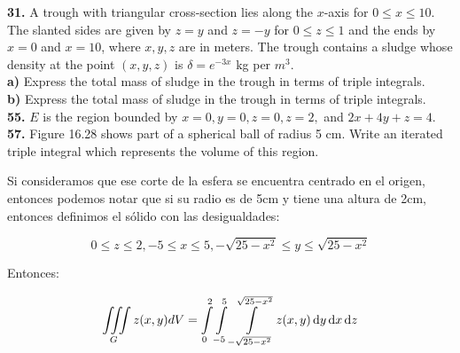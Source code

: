 \documentclass[11pt]{report}
\begin{document}
\textbf{31.} A trough with triangular cross-section lies along the $x$-axis for
$0 \leq x \leq 10$. The slanted sides are given by $z = y$ and $z = -y$ for
$0 \leq z \leq 1$ and the ends by $x = 0$ and $x = 10$, where $x, y, z$ are in meters.
The trough contains a sludge whose density at the point $(x, y, z)$ is
$\delta = e^{-3x}$ kg per $m^3$. \\

\textbf{a)} Express the total mass of sludge in the trough in terms of triple
integrals. \\

\textbf{b)} Express the total mass of sludge in the trough in terms of triple
integrals. \\

\textbf{55.} $E$ is the region bounded by $x = 0, y = 0, z = 0, z = 2,$
and $2x + 4y + z = 4$. \\

\textbf{57.} Figure 16.28 shows part of a spherical ball of radius 5 cm.
Write an iterated triple integral which represents the volume of this region. \\

\begin{figure}[h]
\centering
\end{figure}

Si consideramos que ese corte de la esfera se encuentra centrado en el origen,
entonces podemos notar que si su radio es de 5cm y tiene una altura de 2cm,
entonces definimos el sólido con las desigualdades:

\[ 0 \leq z \leq 2, -5 \leq x \leq 5, - \sqrt{25 - x^2} \leq y \leq \sqrt{25 - x^2}\]

Entonces:

\[ \iiint \limits_G z(x,y) dV = \int \limits_0^2 \int \limits_{-5}^5
        \int \limits_{- \sqrt{25 - x^2}}^{\sqrt{25 - x^2}} z(x,y) \, \text dy \, \text dx \, \text dz  \]
\end{document}
